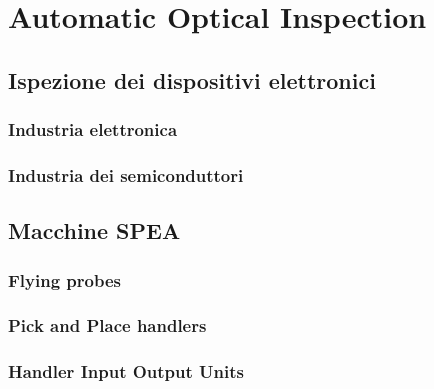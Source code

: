 \chapter{Automatic Optical Inspection}
\section{Ispezione dei dispositivi elettronici}
\subsection{Industria elettronica}
\subsection{Industria dei semiconduttori}
\section{Macchine SPEA}
\subsection{Flying probes}
\subsection{Pick and Place handlers}
\subsection{Handler Input Output Units}